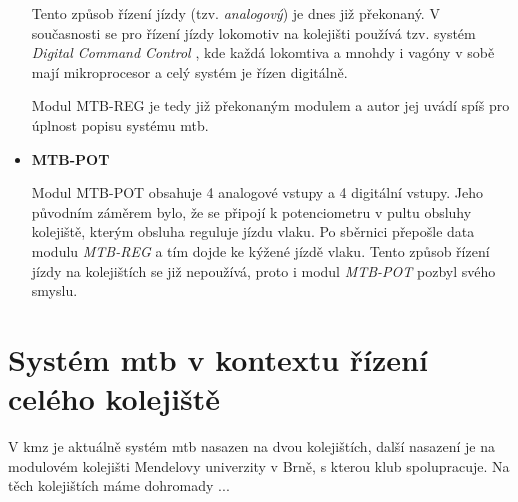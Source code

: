 \begin{itemize}
	Tento způsob řízení jízdy (tzv. \textit{analogový}) je dnes již překonaný.
	V současnosti se pro řízení jízdy lokomotiv na kolejišti používá tzv. systém
	\textit{Digital Command Control} \cite{dcc}, kde každá lokomtiva a mnohdy
	i vagóny v sobě mají mikroprocesor a celý systém je řízen digitálně.

	Modul MTB-REG je tedy již překonaným modulem a autor jej uvádí spíš pro
	úplnost popisu systému \gls{mtb}.

\item \textbf{MTB-POT}

	Modul MTB-POT obsahuje 4 analogové vstupy a 4 digitální vstupy. Jeho
	původním záměrem bylo, že se připojí k potenciometru v pultu obsluhy
	kolejiště, kterým obsluha reguluje jízdu vlaku. Po sběrnici přepošle data
	modulu \textit{MTB-REG} a tím dojde ke kýžené jízdě vlaku. Tento způsob
	řízení jízdy na kolejištích se již nepoužívá, proto i modul \textit{MTB-POT}
	pozbyl svého smyslu.

\end{itemize}

\section{Systém \gls{mtb} v kontextu řízení celého kolejiště} \label{sec:mtb_context}

V \gls{kmz} je aktuálně systém \gls{mtb} nasazen na dvou kolejištích, další
nasazení je na modulovém kolejišti Mendelovy univerzity v Brně, s kterou klub
spolupracuje. Na těch kolejištích máme dohromady ...
